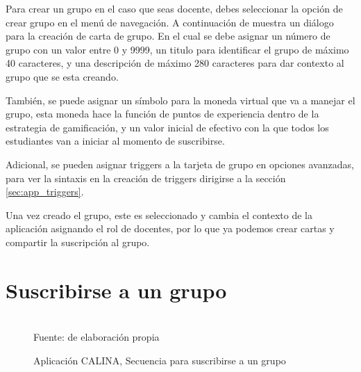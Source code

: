 Para crear un grupo en el caso que seas docente, debes seleccionar la opción de crear grupo en el menú de 
navegación. A continuación de muestra un diálogo para la creación de carta de grupo. En el cual se debe 
asignar un número de grupo con un valor entre 0 y 9999, un titulo para identificar el grupo de máximo 40
caracteres, y una descripción de máximo 280 caracteres para dar contexto al grupo que se esta creando.

También, se puede asignar un símbolo para la moneda virtual que va a manejar el grupo, esta moneda hace la
función de puntos de experiencia dentro de la estrategia de gamificación, y un valor inicial de efectivo con
la que todos los estudiantes van a iniciar al momento de suscribirse.

Adicional, se pueden asignar triggers a la tarjeta de grupo en opciones avanzadas, para ver la sintaxis en la 
creación de triggers dirigirse a la sección \ref{sec:app_triggers}.

Una vez creado el grupo, este es seleccionado y cambia el contexto de la aplicación asignando el rol de 
docentes, por lo que ya podemos crear cartas y compartir la suscripción al grupo.

\section{Suscribirse a un grupo}

\begin{figure}[!htb]
\caption[]{Aplicación CALINA, Secuencia para suscribirse a un grupo}
\centering
\begin{adjustbox}{width=15cm}
\end{adjustbox}
\\
{\footnotesize Fuente: de elaboración propia}
\end{figure}

